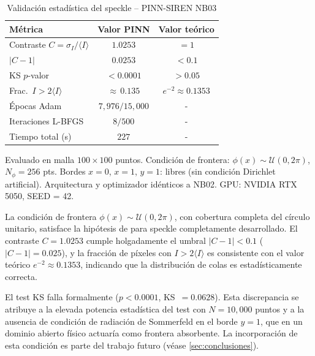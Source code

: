 \begin{table}[htbp]
\centering
\begin{threeparttable}
\caption{Validación estadística del speckle -- PINN-SIREN NB03}
\label{tab:resultados_speckle}
\begin{tabular}{lcc}
\toprule
Métrica & Valor PINN & Valor teórico \\
\midrule
Contraste $C = \sigma_I / \langle I \rangle$ & $1.0253$ & $= 1$ \\
$|C - 1|$                                    & $0.0253$ & $< 0.1$ \\
KS $p$-valor                                 & $< 0.0001$ & $> 0.05$ \\
Frac.\ $I > 2\langle I \rangle$              & ${\approx}\,0.135$ & $e^{-2} \approx 0.1353$ \\
\midrule
Épocas Adam                                  & $7{,}976 / 15{,}000$ & - \\
Iteraciones L-BFGS                           & $8 / 500$ & - \\
Tiempo total (s)                             & $227$ & - \\
\bottomrule
\end{tabular}
\begin{tablenotes}
\small
\item Evaluado en malla $100 \times 100$ puntos.
      Condición de frontera: $\phi(x) \sim \mathcal{U}(0, 2\pi)$, $N_\phi = 256$ pts.
      Bordes $x=0$, $x=1$, $y=1$: libres (sin condición Dirichlet artificial).
      Arquitectura y optimizador idénticos a NB02.
      GPU: NVIDIA RTX 5050, SEED = 42.
\end{tablenotes}
\end{threeparttable}
\end{table}

La condición de frontera $\phi(x) \sim \mathcal{U}(0, 2\pi)$, con cobertura completa del
círculo unitario, satisface la hipótesis de \citet{Goodman2007_Speckle} para speckle
completamente desarrollado.
El contraste $C = 1.0253$ cumple holgadamente el umbral $|C-1| < 0.1$ ($|C-1| = 0.025$),
y la fracción de píxeles con $I > 2\langle I \rangle$ es consistente con el valor teórico
$e^{-2} \approx 0.1353$, indicando que la distribución de colas es estadísticamente correcta.

El test KS falla formalmente ($p < 0.0001$, KS~$= 0.0628$).
Esta discrepancia se atribuye a la elevada potencia estadística del test con $N = 10{,}000$ puntos
y a la ausencia de condición de radiación de Sommerfeld en el borde $y = 1$, que en un dominio
abierto físico actuaría como frontera absorbente.
La incorporación de esta condición es parte del trabajo futuro (véase \cref{sec:conclusiones}).

